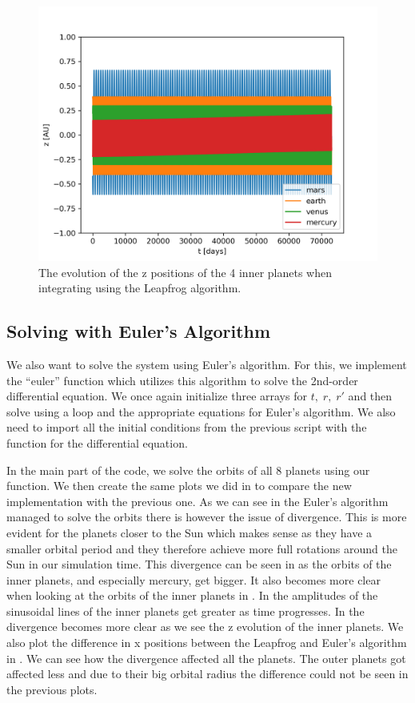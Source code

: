 \documentclass[a4paper,10pt]{article}
\begin{document}
\begin{figure}[H]
  \centering
  \includegraphics[width=.8\linewidth]{./plots/z-leapfrog-zoom.png}
  \caption{The evolution of the z positions of the 4 inner planets when integrating using the Leapfrog algorithm.}
  \label{fig:z-leap-zoom}
\end{figure}

\subsection{Solving with Euler's Algorithm}

We also want to solve the system using Euler's algorithm. For this, we implement the ``euler'' function which utilizes this algorithm to solve the 2nd-order differential equation. We once again initialize three arrays for $t,\;r,\;r'$ and then solve using a loop and the appropriate equations for Euler's algorithm. We also need to import all the initial conditions from the previous script with the function for the differential equation. 



In the main part of the code, we solve the orbits of all 8 planets using our function. We then create the same plots we did in  to compare the new implementation with the previous one. As we can see in  the Euler's algorithm managed to solve the orbits there is however the issue of divergence. This is more evident for the planets closer to the Sun which makes sense as they have a smaller orbital period and they therefore achieve more full rotations around the Sun in our simulation time. This divergence can be seen in  as the orbits of the inner planets, and especially mercury, get bigger. It also becomes more clear when looking at the orbits of the inner planets in . In  the amplitudes of the sinusoidal lines of the inner planets get greater as time progresses. In  the divergence becomes more clear as we see the z evolution of the inner planets. We also plot the difference in x positions between the Leapfrog and Euler's algorithm in . We can see how the divergence affected all the planets. The outer planets got affected less and due to their big orbital radius the difference could not be seen in the previous plots. 
\end{document}
